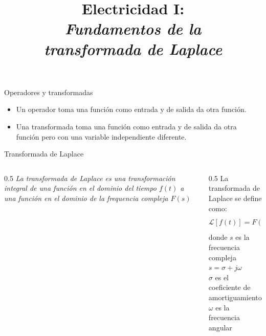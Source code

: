 \documentclass[aspectratio=169]{beamer}
\title{
    Electricidad I:\\
    \alert{\emph{Fundamentos de la}}\\
    \alert{\emph{transformada de Laplace}}
}
\begin{document}


\begin{frame}{Operadores y transformadas}
        \begin{itemize}
            \item<1-> Un operador toma una función como entrada y de salida da otra función.
            \item<2> Una transformada toma una función como entrada y de salida da otra función pero con una variable independiente diferente.
        \end{itemize}
\end{frame}

\begin{frame}{Transformada de Laplace}
    \begin{columns}[onlytextwidth]
        \begin{column}{0.5\textwidth}
            \emph{La transformada de Laplace es una transformación integral de una función en el dominio del tiempo $f(t)$ a una función en el dominio de la frequencia compleja $F(s)$}
        \end{column}
        \begin{column}{0.5\textwidth}
            La transformada de Laplace se define como:
            \begin{equation*}
                \mathcal{L}[f(t)] = F(s) = \int_{0^{-}}^\infty f(t)e^{-st}\,dt
            \end{equation*}
            donde $s$ es la frecuencia compleja $s = \sigma + j\omega$\\[8pt]
            $\sigma$ es el coeficiente de amortiguamiento\\[8pt]
            $\omega$ es la frecuencia angular\\[8pt]
        \end{column}
    \end{columns}
\end{frame}
\end{document}
